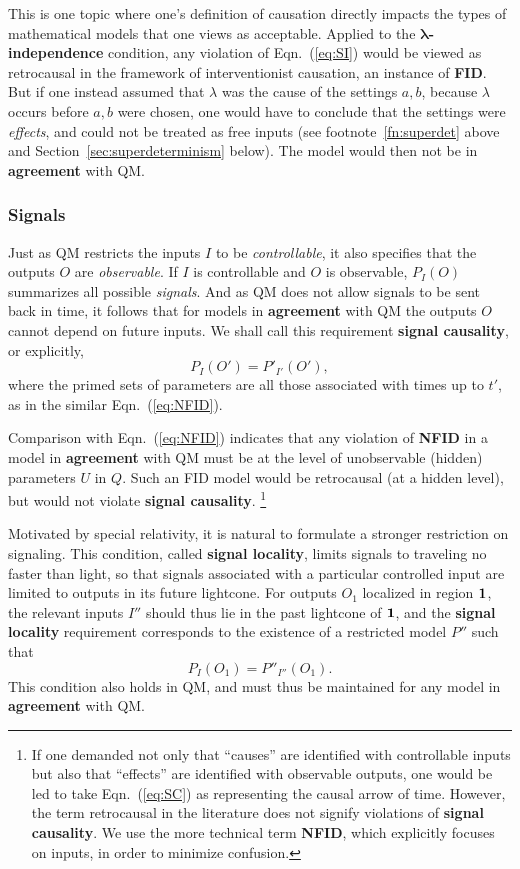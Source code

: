 \documentclass[rmp, aps, preprint, longbibliography]{revtex4-1}
\newcommand{\eq}[1]{{Eqn.~(\ref{#1})}}
\begin{document}
This is one topic where one's definition of causation directly impacts the types of mathematical models that one views as acceptable.  Applied to the {\bf $\bm{\lambda}$-independence} condition, any violation of \eq{eq:SI} would be viewed as retrocausal in the framework of interventionist causation, an instance of {\bf FID}.  But if one instead assumed that $\lambda$ was the cause of the settings $a,b$, because $\lambda$ occurs before $a,b$ were chosen, one would have to conclude that the settings were \emph{effects}, and could not be treated as free inputs (see footnote~\ref{fn:superdet} above and Section~\ref{sec:superdeterminism} below).  The model would then not be in {\bf agreement} with QM.

\subsubsection{Signals}

Just as QM restricts the inputs $I$ to be {\em controllable}, it also specifies that the outputs $O$ are {\em observable}.  If $I$ is controllable and $O$ is observable, $P_I(O)$ summarizes all possible {\em signals}.  And as QM does not allow signals to be sent back in time, it follows that for models in {\bf agreement} with QM the outputs $O$ cannot depend on future inputs.  We shall call this requirement {\bf signal causality}, or explicitly,
\begin{equation}
\label{eq:SC}
P_I(O')=P'_{I'}(O'),
\end{equation} 
where the primed sets of parameters are all those associated with times up to $t'$, as in the similar Eqn.~(\ref{eq:NFID}).  

Comparison with Eqn.~(\ref{eq:NFID}) indicates that any violation of {\bf NFID} in a model in {\bf agreement} with QM must be at the level of unobservable (hidden) parameters $U$ in $Q$.  Such an FID model would be retrocausal (at a hidden level), but would not violate {\bf signal causality}.%
\footnote{
If one demanded not only that ``causes'' are identified with controllable inputs but also that ``effects'' are identified with observable outputs, one would be led to take \eq{eq:SC} as representing the causal arrow of time.  However, the term retrocausal in the literature does not signify violations of {\bf signal causality}.  We use the more technical term {\bf NFID}, which explicitly focuses on inputs, in order to minimize confusion.}

Motivated by special relativity, it is natural to formulate a stronger restriction on signaling.  This condition, called {\bf signal locality}, limits signals to traveling no faster than light, so that signals associated with a particular controlled input are limited to outputs in its future lightcone.  For outputs $O_1$ localized in region $\bf{1}$, the relevant inputs $I''$ should thus lie in the past lightcone of $\bf{1}$, and the {\bf signal locality} requirement corresponds to the existence of a restricted model $P''$ such that
\begin{equation}
\label{eq:SL}
P_I(O_1)=P''_{I''}(O_1).
\end{equation}
This condition also holds in QM, and must thus be maintained for any model in {\bf agreement} with QM.
\end{document}
